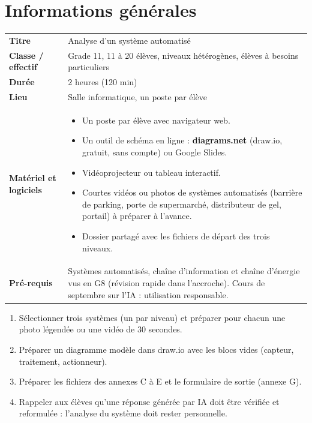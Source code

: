 \documentclass[11pt,a4paper]{article}
\begin{document}

\section{Informations générales}
\begin{tabularx}{\linewidth}{>{\bfseries}p{3.6cm}Y}
\toprule
Titre & Analyse d'un système automatisé\\
Classe / effectif & Grade 11, 11 à 20 élèves, niveaux hétérogènes, élèves à besoins particuliers\\
Durée & 2 heures (120 min)\\
Lieu & Salle informatique, un poste par élève\\
Matériel et logiciels &
\begin{itemize}
 \item Un poste par élève avec navigateur web.
 \item Un outil de schéma en ligne : \textbf{diagrams.net} (draw.io, gratuit, sans compte) ou Google Slides.
 \item Vidéoprojecteur ou tableau interactif.
 \item Courtes vidéos ou photos de systèmes automatisés (barrière de parking, porte de supermarché, distributeur de gel, portail) à préparer à l'avance.
 \item Dossier partagé avec les fichiers de départ des trois niveaux.
\end{itemize}\\
Pré-requis &
Systèmes automatisés, chaîne d'information et chaîne d'énergie vus en G8 (révision rapide dans l'accroche). Cours de septembre sur l'IA : utilisation responsable.\\
\bottomrule
\end{tabularx}

\begin{astuce}
\begin{enumerate}
 \item Sélectionner trois systèmes (un par niveau) et préparer pour chacun une photo légendée ou une vidéo de 30 secondes.
 \item Préparer un diagramme modèle dans draw.io avec les blocs vides (capteur, traitement, actionneur).
 \item Préparer les fichiers des annexes C à E et le formulaire de sortie (annexe G).
 \item Rappeler aux élèves qu'une réponse générée par IA doit être vérifiée et reformulée : l'analyse du système doit rester personnelle.
\end{enumerate}
\end{astuce}
\end{document}
